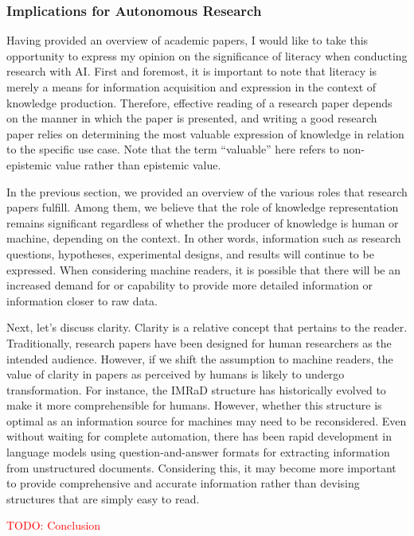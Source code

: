 \documentclass{book}
\begin{document}
\subsubsection{Implications for Autonomous Research}
Having provided an overview of academic papers, I would like to take this opportunity to express my opinion on the significance of literacy when conducting research with AI. First and foremost, it is important to note that literacy is merely a means for information acquisition and expression in the context of knowledge production. Therefore, effective reading of a research paper depends on the manner in which the paper is presented, and writing a good research paper relies on determining the most valuable expression of knowledge in relation to the specific use case. Note that the term ``valuable'' here refers to non-epistemic value rather than epistemic value.

In the previous section, we provided an overview of the various roles that research papers fulfill. Among them, we believe that the role of knowledge representation remains significant regardless of whether the producer of knowledge is human or machine, depending on the context. In other words, information such as research questions, hypotheses, experimental designs, and results will continue to be expressed. When considering machine readers, it is possible that there will be an increased demand for or capability to provide more detailed information or information closer to raw data.

Next, let's discuss clarity. Clarity is a relative concept that pertains to the reader. Traditionally, research papers have been designed for human researchers as the intended audience. However, if we shift the assumption to machine readers, the value of clarity in papers as perceived by humans is likely to undergo transformation. For instance, the IMRaD structure has historically evolved to make it more comprehensible for humans. However, whether this structure is optimal as an information source for machines may need to be reconsidered. Even without waiting for complete automation, there has been rapid development in language models using question-and-answer formats for extracting information from unstructured documents. Considering this, it may become more important to provide comprehensive and accurate information rather than devising structures that are simply easy to read.

\textcolor{red}{TODO: Conclusion}
\end{document}
